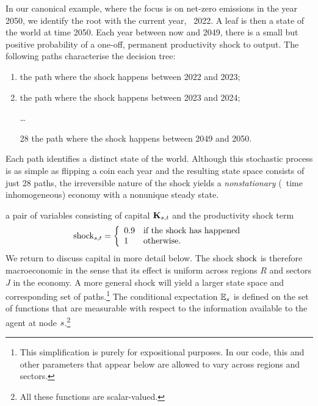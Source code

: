 \documentclass[12pt,a4paper,twoside, draft]{article}
\begin{document}
\begin{example}\label{eg-irreversible}
   In our canonical example, where the focus is on net-zero emissions in the
   year 2050, we identify the root with the current year, \eg~2022.
   A leaf is then a state of the world at time 2050.
   Each year between now and 2049, there is a small but positive probability of
   a one-off, permanent productivity shock to output.
   The following paths characterise the decision tree:
   \begin{enumerate}[1]
      \item the path where the shock happens between 2022 and 2023;
      \item the path where the shock happens between 2023 and 2024;
      \item[] \dots
      \item[28] the path where the shock happens between 2049 and 2050.
   \end{enumerate}
   Each path identifies a distinct state of the world.
   Although this stochastic process is as simple as flipping a coin
   each year and the resulting state space consists of just 28 paths,
   the irreversible nature of the shock yields a
   \emph{nonstationary} (\ie~time inhomogeneous) economy with a nonunique
   steady state.
\end{example}
a pair of variables consisting  of capital
$\mathbf{K}_{{s}, t}$ and the productivity shock term
\begin{equation}
  \textup{shock}_{{s}, t} = \left\{
    \begin{array}{ll}
       0.9 & \textup{if the shock has happened}\\
       1 & \textup{otherwise.}
    \end{array}\right.
\end{equation}
We return to discuss capital in more detail below.
The shock $\textup{shock}$ is therefore macroeconomic in the sense that
its effect is uniform across regions $R$ and sectors $J$ in the economy.
A more general shock will yield a larger state space and corresponding set of
paths.\footnote{
   This simplification is purely for expositional purposes.
   In our code, this and other parameters that appear below are allowed to vary 
   across regions and sectors.
}
The conditional expectation $\mathbb{E}_{{s}}$ is defined on the set of functions
that are measurable with respect to the information available to the agent at 
node ${s}$.\footnote{
   All these functions are scalar-valued.
}
\end{document}
